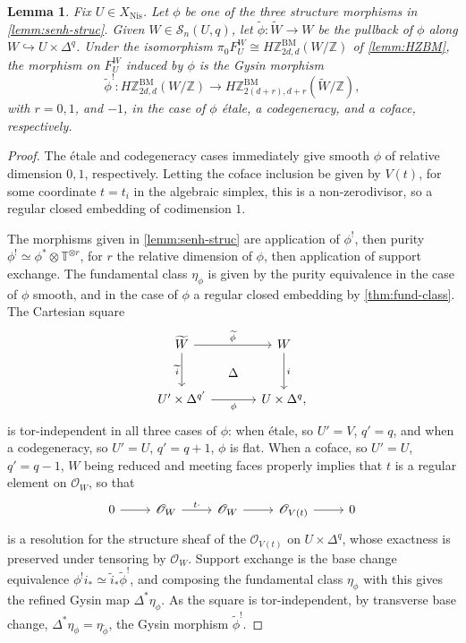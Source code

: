 \documentclass[11pt, twoside]{article}
\numberwithin{equation}{section}
\newtheorem{lemma}[equation]{Lemma}
\theoremstyle{definition}
\newcommand{\bb}[1]{\mathbb{#1}}
\newcommand{\bm}{\mathrm{BM}}
\newcommand{\nis}{\mathrm{Nis}}
\begin{document}
\begin{lemma}\label{lemm:gys-struct}
Fix \(U \in X_\nis\). Let \(\phi\) be one of the three structure morphisms in \ref{lemm:senh-struc}. Given \(W \in \mathcal{S}_n(U, q)\), let \(\tilde{\phi} \colon \tilde{W} \to W\) be the pullback of \(\phi\) along \(W \hookrightarrow U \times \Delta^q\). Under the isomorphism \(\pi_0 F_U^W \cong H\bb{Z}_{2d, d}^\bm(W/\bb{Z})\) of \ref{lemm:HZBM}, the morphism on \(F_U^W\) induced by \(\phi\) is the Gysin morphism 
\[\tilde{\phi}^! \colon H\bb{Z}_{2d, d}^\bm(W/\bb{Z}) \to H\bb{Z}_{2(d + r), d + r}^\bm(\tilde{W}/\bb{Z}),\]
with \(r = 0, 1\), and \(- 1\), in the case of \(\phi\) étale, a codegeneracy, and a coface, respectively.
\end{lemma}

\begin{proof}
The étale and codegeneracy cases immediately give smooth \(\phi\) of relative dimension \(0, 1\), respectively. Letting the coface inclusion be given by \(V(t)\), for some coordinate \(t = t_i\) in the algebraic simplex, this is a non-zerodivisor, so a regular closed embedding of codimension \(1\).

The morphisms given in \ref{lemm:senh-struc} are application of \(\phi^!\), then purity \(\phi^!\simeq \phi^* \otimes \bb{T}^{\otimes r}\), for \(r\) the relative dimension of \(\phi\), then application of support exchange. The fundamental class \(\eta_\phi\) is given by the purity equivalence in the case of \(\phi\) smooth, and in the case of \(\phi\) a regular closed embedding by \ref{thm:fund-class}. The Cartesian square 
\[\begin{tikzcd} [row sep = large, column sep = large]
\tilde{W} \ar[d, "\tilde{i}", swap] \ar[r, "\tilde{\phi}", ""{name=h1}] & W \ar[d, "i"]\\
U' \times \Delta^{q'} \ar[r, "\phi", swap, ""{name=h2}] & U \times \Delta^q,
\ar[phantom, from=h1, to=h2, "\Delta"]
\end{tikzcd}\]
is tor-independent in all three cases of \(\phi\): when étale, so \(U' = V\), \(q' = q\), and when a codegeneracy, so \(U' = U\), \(q' = q + 1\), \(\phi\) is flat. When a coface, so \(U' = U\), \(q' = q - 1\), \(W\) being reduced and meeting faces properly implies that \(t\) is a regular element on \(\mathscr{O}_W\), so that 
\[\begin{tikzcd}
0 \ar[r] & \mathscr{O}_W \ar[r, "t \cdot"] & \mathscr{O}_W \ar[r] & \mathscr{O}_{V(t)} \ar[r] & 0
\end{tikzcd}\]
is a resolution for the structure sheaf of the \(\mathscr{O}_{V(t)}\) on \(U \times \Delta^q\), whose exactness is preserved under tensoring by \(\mathscr{O}_W\). Support exchange is the base change equivalence \(\phi^! i_* \simeq \tilde{i}_* \tilde{\phi}^!\), and composing the fundamental class \(\eta_\phi\) with this gives the refined Gysin map \(\Delta^* \eta_\phi\). As the square is tor-independent, by transverse base change, \(\Delta^* \eta_\phi = \eta_{\tilde{\phi}}\), the Gysin morphism \(\tilde{\phi}^!\).
\end{proof}
\end{document}
